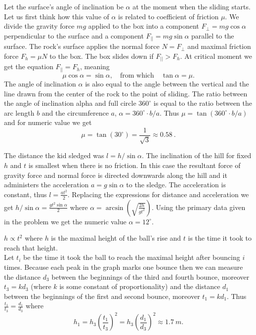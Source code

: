 \documentclass[11pt]{article}
\begin{document}

\solueng
Let the surface’s angle of inclination be $\alpha$ at the moment when the sliding starts. Let us first think how this value of $\alpha$ is related to coefficient of friction $\mu$. We divide the gravity force $mg$ applied to the box into a component $F_{\bot}=mg\cos\alpha$ perpendicular to the surface and a component $F_{||}=mg\sin\alpha$ parallel to the surface. The rock’s surface applies the normal force $N=F_\bot$ and maximal friction force $F_h=\mu N$ to the box. The box slides down if $F_{||}>F_h$. At critical moment we get the equation $F_{||}=F_h$, meaning
\[ \mu \cos \alpha = \sin\alpha, \quad \text{from which} \quad \tan\alpha = \mu.\]
The angle of inclination $\alpha$ is also equal to the angle between the vertical and the line drawn from the center of the rock to the point of sliding. The ratio between the angle of inclination alpha and full circle $360^\circ$ is equal to the ratio between the arc length $b$ and the circumference $a$, $\alpha = 360^\circ \!\cdot\! b/a$. Thus $\mu = \tan (360^\circ \! \cdot\! b/a)$ and for numeric value we get 
\[\mu = \tan (30^\circ) = \frac{1}{\sqrt{3}} \approx \SI{0,58}{}.\]
\probend
\bigskip


\solueng
The distance the kid sledged was $l=h / \sin \alpha$. The inclination of the hill for fixed $h$ and $t$ is smallest when there is no friction. In this case the resultant force of gravity force and normal force is directed downwards along the hill and it administers the acceleration $a=g \sin \alpha$ to the sledge. The acceleration is constant, thus $l=\frac{a t^2}{2}$. Replacing the expressions for distance and acceleration we get $h / \sin \alpha = \frac{g t^2 \sin \alpha}{2}$ where $\alpha = \arcsin( \sqrt{\frac{2h}{g t^2}})$. Using the primary data given in the problem we get the numeric value $\alpha = 12^\circ$.
\probend
\bigskip


\solueng
$h \propto t^{2}$ where $h$ is the maximal height of the ball’s rise and $t$ is the time it took to reach that height.\\
Let $t_{i}$ be the time it took the ball to reach the maximal height after bouncing $i$ times. Because each peak in the graph marks one bounce then we can measure the distance $d_{3}$ between the beginnings of the third and fourth bounce, moreover $t_{3}=kd_{3}$ (where $k$ is some constant of proportionality) and the distance $d_{1}$ between the beginnings of the first and second bounce, moreover $t_{1}=kd_{1}$. Thus $\frac{t_{1}}{t_{3}}=\frac{d_{1}}{d_{3}}$ where 
$$h_{1}=h_{3}(\frac{t_{1}}{t_{3}})^{2}=h_{3}(\frac{d_{1}}{d_{3}})^{2} \approx \SI{1,7}{m}.$$
\probend
\bigskip
\end{document}
